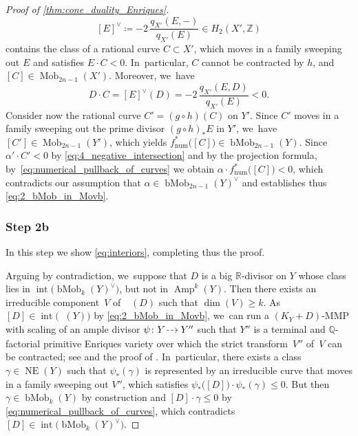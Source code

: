 \documentclass[JEP,XML,SOM,Unicode,published]{cedram}
\newcommand{\dradpl}{{\hspace*{-2.5mm}\begin{tikzcd}[ampersand replacement=\&,column sep = scriptsize]\mbox{}\ar[r,dashed]\&\mbox{}\end{tikzcd}\hspace*{-2.5mm}}}
\newcommand{\dratst}{{\hspace*{-2.5mm}\begin{tikzcd}[ampersand replacement=\&,column sep = small]\mbox{}\ar[r,dashed]\&\mbox{}\end{tikzcd}\hspace*{-2mm}}}
\let\drascst\dratst
\newcommand{\dra}{\mathchoice{\dradpl}{\dratst}{\drascst}{\drascst}}
\theoremstyle{plain}
\theoremstyle{definition}
\newcommand{\Z}{\mathbb{Z}}
\newcommand{\Q}{\mathbb{Q}}
\newcommand{\R}{\mathbb{R}}
\DeclareMathOperator{\Amp}{\mathrm{Amp}}
\DeclareMathOperator{\Movb}{\overline{\mathrm{Mov}}}
\DeclareMathOperator{\NE}{\mathrm{NE}}
\DeclareMathOperator{\Mob}{Mob}
\DeclareMathOperator{\bMob}{bMob}
\DeclareMathOperator{\abs}{\boldsymbol{B}_{+}}
\begin{document}
\begin{proof}[Proof of \autoref{thm:cone_duality_Enriques}]
\[
[E]^{\vee} \coloneqq -2\, \frac{q_{X'}(E,-)}{q_{X'}(E)} \in H_2(X', \Z)
\]
contains the class of a rational curve $C \subset X'$, which moves in a family sweeping out $E$ and satisfies $E \cdot C < 0$. In~particular, $C$ cannot be contracted by $h$, and $[C] \in \Mob_{2n-1}(X')$. Moreover, we~have
\begin{equation}
\label{eq:4_negative_intersection}
D \cdot C = [E]^{\vee} (D) = -2\, \frac{q_{X'}(E,D)}{q_{X'}(E)} < 0.
\end{equation}
Consider now the rational curve $C' = (g \circ h) (C)$ on $Y'$. Since $C'$ moves in a family sweeping out the prime divisor $(g\circ h)_* E$ in $Y'$, we~have $[C'] \in \Mob_{2n-1}(Y')$, which yields $f^*_\mathrm{num} \bigl([C] \bigr) \in \bMob_{2n-1}(Y)$. Since $\alpha' \cdot C' < 0$ by \eqref{eq:4_negative_intersection} and by the projection formula, by~\eqref{eq:numerical_pullback_of_curves} we obtain $\alpha \cdot f^*_\mathrm{num} \bigl([C] \bigr) < 0$, which contradicts our assumption that $\alpha \in \bMob_{2n-1}(Y)^{\vee}$ and establishes thus \eqref{eq:2_bMob_in_Movb}.

\subsubsection*{Step 2b}
In this step we show \eqref{eq:interiors}, completing thus the proof.

Arguing by contradiction, we~suppose that $D$ is a big $\R$\nobreakdash-divisor on $Y$ whose class lies in $\operatorname{int} \bigl(\bMob_k(Y)^{\vee} \bigr)$, but not in $\Amp^k(Y)$. Then there exists an irreducible component~$V$ of~$\abs(D)$ such that $\dim(V) \geq k$. As $[D] \in \operatorname{int} \bigl(\Movb(Y) \bigr)$ by \eqref{eq:2_bMob_in_Movb}, we~can run a $(K_Y+D)$-MMP with scaling of an ample divisor $\psi\colon Y\dra Y''$ such that $Y''$ is a terminal and $\Q$\nobreakdash-factorial primitive Enriques variety over which the strict transform~$V''$ of~$V$ can be contracted; see \cite[Lem.\,4.1]{TX25} and the proof of \cite[Th.\,A(ii)]{TX25}. In~particular, there exists a class $\gamma \in \NE(Y)$ such that $\psi_*(\gamma)$ is represented by an irreducible curve that moves in a family sweeping out $V''$, which satisfies $\psi_* \bigl([D] \bigr) {\cdot} \psi_*(\gamma) \leq 0$.
But then $\gamma \in \bMob_k(Y)$ by construction and $[D] \cdot \gamma \leq 0$ by \eqref{eq:numerical_pullback_of_curves}, which contradicts $[D] \in \operatorname{int} \bigl(\bMob_k(Y)^{\vee} \bigr)$.
\end{proof}

\backmatter


\newpage
\end{document}
